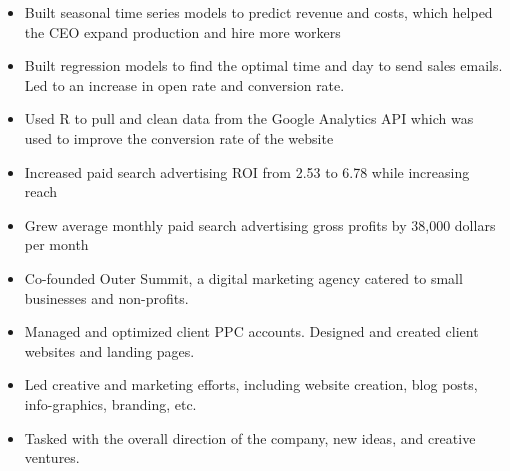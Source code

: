 \documentclass[10pt,a4paper]{altacv}
\begin{document}

\begin{fullwidth}
\makecvheader
\end{fullwidth}


\begin{itemize}
\item Built seasonal time series models to predict revenue and costs, which helped the CEO expand production and hire more workers
\item Built regression models to find the optimal time and day to send sales emails. Led to an increase in open rate and conversion rate.
\item Used R to pull and clean data from the Google Analytics API which was used to improve the conversion rate of the website
\item Increased paid search advertising ROI from 2.53 to 6.78 while increasing reach
\item Grew average monthly paid search advertising gross profits by 38,000 dollars per month
\end{itemize}

\divider

\begin{itemize}
\item Co-founded Outer Summit, a digital marketing agency catered to small businesses and non-profits.
\item Managed and optimized client PPC accounts. Designed and created client websites and landing pages.
\item Led creative and marketing efforts, including website creation, blog posts, info-graphics, branding, etc.
\item Tasked with the overall direction of the company, new ideas, and creative ventures.
\end{itemize}
\end{document}
